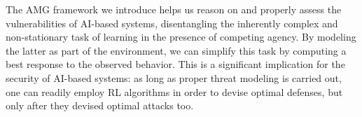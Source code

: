 The AMG framework we introduce helps us reason on and properly assess the vulnerabilities of AI-based systems, disentangling the inherently complex and non-stationary task of learning in the presence of competing agency.
By modeling the latter as part of the environment, we can simplify this task by computing a best response to the observed behavior.
This is a significant implication for the security of AI-based systems: as long as proper threat modeling is carried out, one can readily employ \gls{RL} algorithms in order to devise optimal defenses, but only after they devised optimal attacks too.
